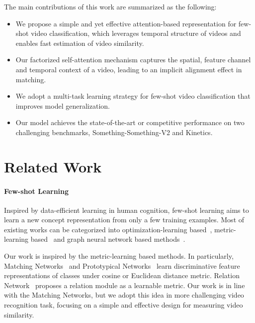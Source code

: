 \documentclass{article}
\begin{document}
The main contributions of this work are summarized as the following:
\begin{itemize}[itemsep=0.25mm,topsep=0.5mm]
    \item We propose a simple and yet effective attention-based representation for few-shot video classification, which leverages temporal structure of videos and enables fast estimation of video similarity. 
    \item Our factorized self-attention mechanism captures the spatial, feature channel and temporal context of a video, leading to an implicit alignment effect in matching.   
\item We adopt a multi-task learning strategy for few-shot video classification that improves model generalization.
    \item Our model achieves the state-of-the-art or competitive performance on two challenging benchmarks, Something-Something-V2 and Kinetics.
\end{itemize} \section{Related Work}\label{sec:related}
\paragraph{Few-shot Learning}
Inspired by data-efficient learning in human cognition, few-shot learning aims to learn a new concept representation from only a few training examples. Most of existing works can be categorized into optimization-learning based~\cite{finn2017model,nichol2018reptile,ravi2016optimization,munkhdalai2017meta}, metric-learning based~\cite{vinyals2016matching,snell2017prototypical,sung2018learning} and graph neural network based methods~\cite{garcia2017few}.




Our work is inspired by the metric-learning based methods. In particularly, Matching Networks~\cite{vinyals2016matching} and Prototypical Networks~\cite{snell2017prototypical,liu2020part} learn discriminative feature representations of classes under cosine or Euclidean distance metric. Relation Network~\cite{sung2018learning} proposes a relation module as a learnable metric.
Our work is in line with the Matching Networks, but we adopt this idea in more challenging video recognition task, focusing on a simple and effective design for measuring video similarity.
\end{document}
